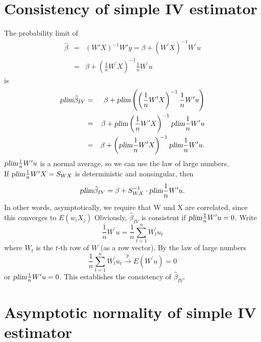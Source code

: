\documentclass{article}
\begin{document}
\section{Consistency of simple IV estimator}

The probability limit of%
\begin{eqnarray*}
\hat{\beta} &=&(W'X)^{-1}W'y = \beta +\left( W^{\prime }X\right) ^{-1}W^{\prime }u \\
&=&\beta +\left( \frac{1}{n}W^{\prime }X\right) ^{-1}\frac{1}{n}W^{\prime }u
\end{eqnarray*}%
is%
\begin{eqnarray*}
\textsl{plim}\hat{\beta}_{IV} &=&\beta +\textsl{plim}\left( \left( \frac{1%
}{n}W^{\prime }X\right) ^{-1}\frac{1}{n}W^{\prime }u\right) \\
&=&\beta +\textsl{plim}\left( \frac{1}{n}W^{\prime }X\right) ^{-1}\textsl{%
plim}\frac{1}{n}W^{\prime }u \\
&=&\beta +\left( \textsl{plim}\frac{1}{n}W^{\prime }X\right) ^{-1}\textsl{%
plim}\frac{1}{n}W^{\prime }u.
\end{eqnarray*}%
$\textsl{plim}\frac{1}{n}W^{\prime }u$ is a normal average, so we can use the law of large numbers.\\
If $\textsl{plim}\frac{1}{n}W^{\prime }X=S_{WX}$ is deterministic and
nonsingular, then%
\begin{equation*}
\textsl{plim}\hat{\beta}_{IV}=\beta +S_{WX}^{-1}\cdot \textsl{plim}\frac{1%
}{n}W^{\prime }u.
\end{equation*}
In other words, asymptotically, we require that W und X are correlated, since this converges to $E(w_i X_j)$
Obviously, $\hat{\beta}_{IV}$ is consistent if $\textsl{plim}\frac{1}{n}%
W^{\prime }u=0$. Write%
\begin{equation*}
\frac{1}{n}W^{\prime }u=\frac{1}{n}\sum_{t=1}^{n}W_{t}^{\prime }u_{t}
\end{equation*}%
where $W_{t}$ is the $t$-th row of $W$ (as a row vector). By the law of
large numbers%
\begin{equation*}
\frac{1}{n}\sum_{t=1}^{n}W_{t}^{\prime }u_{t}\overset{p}{\rightarrow }%
E\left( W^{\prime }u\right) =0
\end{equation*}%
or $\textsl{plim}\frac{1}{n}W^{\prime }u=0$. This establishes the
consistency of $\hat{\beta}_{IV}$.

\section{Asymptotic normality of simple IV estimator}
\end{document}
